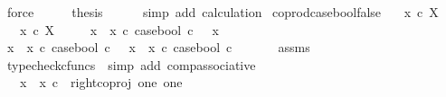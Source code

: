 \begin{isabellebody}
\ force\isanewline
\ \ \isamarkupfalse%
\ \isamarkupfalse%
\ {\isacharquery}{\kern0pt}thesis\isanewline
\ \ \ \ \isamarkupfalse%
\ {\isacharparenleft}{\kern0pt}simp\ add{\isacharcolon}{\kern0pt}\ calculation{\isacharparenright}{\kern0pt}\isanewline
{}\isamarkupfalse%
%
\endisatagproof
{\isafoldproof}%
%
\isadelimproof
\isanewline
%
\endisadelimproof
\isanewline
{}\isamarkupfalse%
\ coprod{\isacharunderscore}{\kern0pt}case{\isacharunderscore}{\kern0pt}bool{\isacharunderscore}{\kern0pt}false{\isacharcolon}{\kern0pt}\isanewline
\ \ \ {\isachardoublequoteopen}x{}\ {\isasymin}\isactrlsub c\ X{\isachardoublequoteclose}\isanewline
\ \ \ {\isachardoublequoteopen}x{}\ {\isasymin}\isactrlsub c\ X{\isachardoublequoteclose}\isanewline
\ \ \ \ \ {\isachardoublequoteopen}{\isacharparenleft}{\kern0pt}x{}\ {\isasymamalg}\ x{}\ {\isasymcirc}\isactrlsub c\ case{\isacharunderscore}{\kern0pt}bool{\isacharparenright}{\kern0pt}\ {\isasymcirc}\isactrlsub c\ {\isasymf}\ {\isacharequal}{\kern0pt}\ x{}{\isachardoublequoteclose}\isanewline
%
\isadelimproof
%
\endisadelimproof
%
\isatagproof
{}\isamarkupfalse%
\ {\isacharminus}{\kern0pt}\ \isanewline
\ \ \isamarkupfalse%
\ {\isachardoublequoteopen}{\isacharparenleft}{\kern0pt}x{}\ {\isasymamalg}\ x{}\ {\isasymcirc}\isactrlsub c\ case{\isacharunderscore}{\kern0pt}bool{\isacharparenright}{\kern0pt}\ {\isasymcirc}\isactrlsub c\ {\isasymf}\ {\isacharequal}{\kern0pt}\ {\isacharparenleft}{\kern0pt}x{}\ {\isasymamalg}\ x{}{\isacharparenright}{\kern0pt}\ {\isasymcirc}\isactrlsub c\ case{\isacharunderscore}{\kern0pt}bool\ {\isasymcirc}\isactrlsub c\ {\isasymf}{\isachardoublequoteclose}\isanewline
\ \ \ \ \isamarkupfalse%
\ assms\ \isamarkupfalse%
\ {\isacharparenleft}{\kern0pt}typecheck{\isacharunderscore}{\kern0pt}cfuncs\ {\isacharcomma}{\kern0pt}\ simp\ add{\isacharcolon}{\kern0pt}\ comp{\isacharunderscore}{\kern0pt}associative{}{\isacharparenright}{\kern0pt}\isanewline
\ \ \isamarkupfalse%
\ \isamarkupfalse%
\ {\isachardoublequoteopen}{\isachardot}{\kern0pt}{\isachardot}{\kern0pt}{\isachardot}{\kern0pt}\ {\isacharequal}{\kern0pt}\ {\isacharparenleft}{\kern0pt}x{}\ {\isasymamalg}\ x{}{\isacharparenright}{\kern0pt}\ {\isasymcirc}\isactrlsub c\ \ right{\isacharunderscore}{\kern0pt}coproj\ one\ one{\isachardoublequoteclose}\isanewline

\end{isabellebody}
